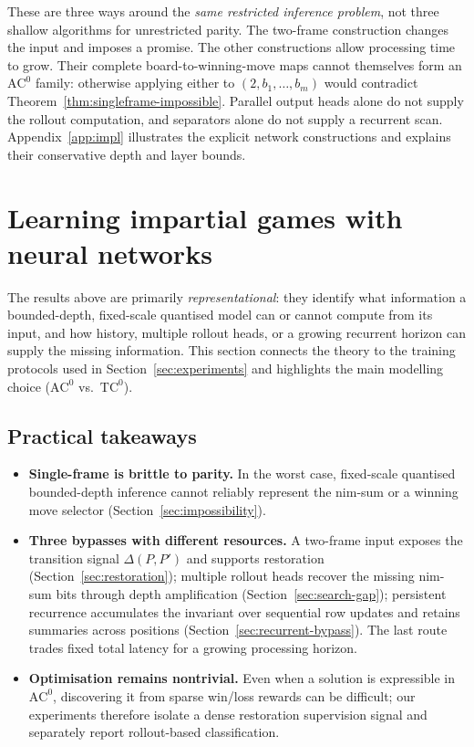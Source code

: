 \documentclass[twoside,11pt]{article}
\newcommand{\AC}{\mathrm{AC}}
\newcommand{\TC}{\mathrm{TC}}
\numberwithin{theorem}{section}
\numberwithin{equation}{section}
\begin{document}
These are three ways around the \emph{same restricted inference problem}, not three shallow algorithms for unrestricted parity. The two-frame construction changes the input and imposes a promise. The other constructions allow processing time to grow. Their complete board-to-winning-move maps cannot themselves form an $\AC^0$ family: otherwise applying either to $(2,b_1,\ldots,b_m)$ would contradict Theorem~\ref{thm:singleframe-impossible}. Parallel output heads alone do not supply the rollout computation, and separators alone do not supply a recurrent scan. Appendix~\ref{app:impl} illustrates the explicit network constructions and explains their conservative depth and layer bounds.

\section{Learning impartial games with neural networks}
\label{sec:learnability}

The results above are primarily \emph{representational}: they identify what information a bounded-depth, fixed-scale quantised model can or cannot compute from its input, and how history, multiple rollout heads, or a growing recurrent horizon can supply the missing information.
This section connects the theory to the training protocols used in Section~\ref{sec:experiments} and highlights the main modelling choice ($\AC^0$ vs.\ $\TC^0$).

\subsection{Practical takeaways}
\begin{itemize}[leftmargin=*]
\item \textbf{Single-frame is brittle to parity.}
In the worst case, fixed-scale quantised bounded-depth inference cannot reliably represent the nim-sum or a winning move selector (Section~\ref{sec:impossibility}).

\item \textbf{Three bypasses with different resources.}
A two-frame input exposes the transition signal $\Delta(P,P')$ and supports restoration (Section~\ref{sec:restoration}); multiple rollout heads recover the missing nim-sum bits through depth amplification (Section~\ref{sec:search-gap}); persistent recurrence accumulates the invariant over sequential row updates and retains summaries across positions (Section~\ref{sec:recurrent-bypass}). The last route trades fixed total latency for a growing processing horizon.

\item \textbf{Optimisation remains nontrivial.}
Even when a solution is expressible in $\AC^0$, discovering it from sparse win/loss rewards can be difficult; our experiments therefore isolate a dense restoration supervision signal and separately report rollout-based classification.
\end{itemize}
\end{document}
